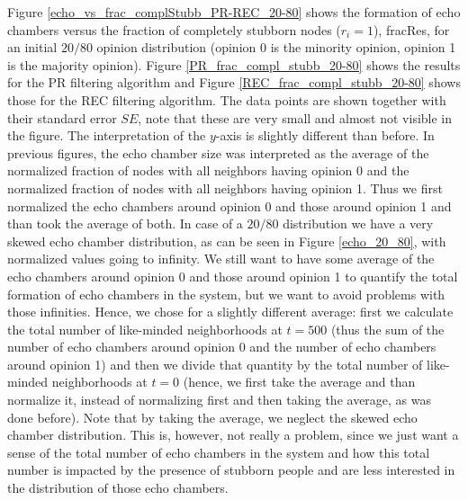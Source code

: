 \documentclass[11 pt , letterpaper , twoside , openright]{book}
\begin{document}
Figure \ref{echo_vs_frac_complStubb_PR-REC_20-80} shows the formation of echo chambers versus the fraction of completely stubborn nodes ($r_i = 1$), fracRes, for an initial $20/80$ opinion distribution (opinion 0 is the minority opinion, opinion 1 is the majority opinion). Figure \ref{PR_frac_compl_stubb_20-80} shows the results for the PR filtering algorithm and Figure \ref{REC_frac_compl_stubb_20-80} shows those for the REC filtering algorithm. The data points are shown together with their standard error $SE$, note that these are very small and almost not visible in the figure. The interpretation of the $y$-axis is slightly different than before. In previous figures, the echo chamber size was interpreted as the average of the normalized fraction of nodes with all neighbors having opinion 0 and the normalized fraction of nodes with all neighbors having opinion 1. Thus we first normalized the echo chambers around opinion 0 and those around opinion 1 and than took the average of both. In case of a $20/80$ distribution we have a very skewed echo chamber distribution, as can be seen in Figure \ref{echo_20_80}, with normalized values going to infinity. We still want to have some average of the echo chambers around opinion 0 and those around opinion 1 to quantify the total formation of echo chambers in the system, but we want to avoid problems with those infinities. Hence, we chose for a slightly different average: first we calculate the total number of like-minded neighborhoods at $t=500$ (thus the sum of the number of echo chambers around opinion 0 and the number of echo chambers around opinion 1) and then we divide that quantity by the total number of like-minded neighborhoods at $t=0$ (hence, we first take the average and than normalize it, instead of normalizing first and then taking the average, as was done before). Note that by taking the average, we neglect the skewed echo chamber distribution. This is, however, not really a problem, since we just want a sense of the total number of echo chambers in the system and how this total number is impacted by the presence of stubborn people and are less interested in the distribution of those echo chambers. \\
\newline
\end{document}
